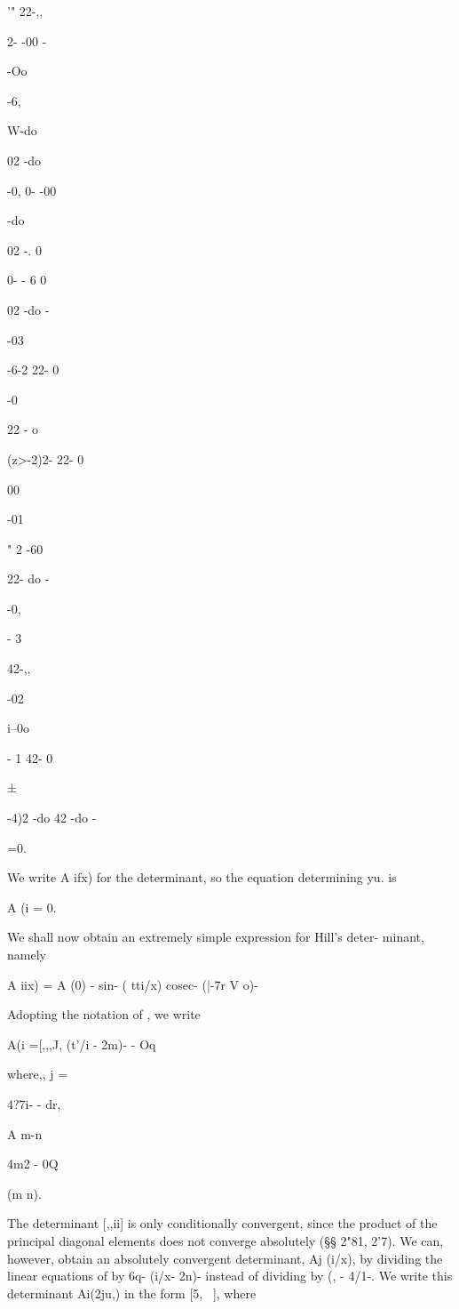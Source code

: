 '" 22-,,

2- -00 -

-Oo

-6,

W-do

02 -do

-0, 0- -00

-do

  02 -. 0

0- - 6 0

02 -do -

-03

-6-2 22- 0

-0

22 - o

(z>-2)2- 22- 0

00

-01

" 2 -60

22- do -

-0,

- 3

42-,,

-02

i--0o

- 1 42- 0

 ±

-4)2 -do 42 -do -

=0.

We write A ifx) for the determinant, so the equation determining yu.
is

A (i = 0.


We shall now obtain an extremely simple expression for Hill's deter-
minant, namely

A iix) = A (0) - sin- ( tti/x) cosec- (|-7r V o)-

Adopting the notation of , we write

A(i =[,,,J, (t'/i - 2m)- - Oq

where,, j =

4?7i- - dr,

A m-n

4m2 - 0Q

(m n).

The determinant [,,ii] is only conditionally convergent, since the
product of the principal diagonal elements does not converge
absolutely (§§ 2"81, 2'7). We can, however, obtain an absolutely
convergent determinant, Aj (i/x), by dividing the linear equations of  by 6q- (i/x- 2n)- instead of dividing by (, - 4/1-. We write
this determinant Ai(2ju,) in the form [5, \ ], where

